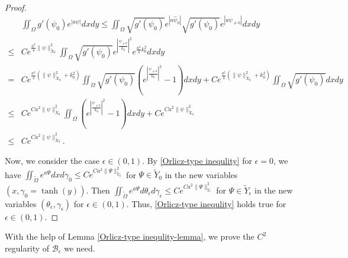 \documentclass[1 [leqno, 11pt]{amsart}
\numberwithin{equation}{section}
\let\ep=\epsilon
\begin{document}
\begin{CJK*}{GBK}{song}
\begin{proof}
\begin{align*}
& \iint_\Omega g'(\psi_0)e^{|a\psi|}  dxdy
 \leq   \iint_\Omega \sqrt{g'(\psi_0)}e^{|a\widehat\psi_0|} \sqrt{g'(\psi_0)} e^{|a\psi_{\neq0}|} dxdy \\
 \leq & Ce^{\frac{a^2}{4} \|\psi\|^2_{\tilde{X}_0}} \iint_\Omega \sqrt{g'(\psi_0)}e^{\left| \frac{\psi_{\neq0}}{k_0}\right|^2} e^{\frac{a^2}{4}k_0^2}  dxdy \\
 = & Ce^{\frac{a^2}{4} \left(\|\psi\|^2_{\tilde{X}_0}+k_0^2\right)} \iint_\Omega \sqrt{g'(\psi_0)} \left( e^{\left| \frac{\psi_{\neq0}}{k_0}\right|^2} - 1\right)  dxdy +  Ce^{\frac{a^2}{4} \left(\|\psi\|^2_{\tilde{X}_0}+k_0^2\right)} \iint_\Omega \sqrt{g'(\psi_0)}  dxdy \\
\leq & Ce^{Ca^2 \|\psi\|^2_{\tilde{X}_0}}  \iint_\Omega \left( e^{\left| \frac{\psi_{\neq0}}{k_0}\right|^2} - 1\right)  dxdy +  Ce^{Ca^2 \|\psi\|^2_{\tilde{X}_0}} \\
\leq & Ce^{Ca^2 \|\psi\|^2_{\tilde{X}_0}}.
\end{align*}

Now, we consider the case $\epsilon\in(0,1)$. By
\eqref{Orlicz-type inequlity} for $\epsilon=0$, we have $\iint_{\tilde\Omega} e^{a\Psi}dxd\gamma_0\leq C e^{Ca^2\|\Psi\|_{\tilde Y_0}^2}$ for $\Psi\in\tilde Y_0$ in the new variables $(x,\gamma_0=\tanh(y))$. Then $\iint_{\tilde \Omega} e^{a\Psi}d\theta_\ep d\gamma_\ep\leq C e^{Ca^2\|\Psi\|_{\tilde Y_\ep}^2}$ for $\Psi\in\tilde Y_\ep$ in the new variables $(\theta_\ep,\gamma_\ep)$ for $\epsilon\in(0,1)$. Thus, \eqref{Orlicz-type inequlity} holds true  for $\epsilon\in(0,1)$.
\end{proof}

With the help of Lemma \ref{Orlicz-type inequlity-lemma}, we prove the $C^2$ regularity of $\mathscr{B}_\ep$ we need.




\end{CJK*}
\end{document}
